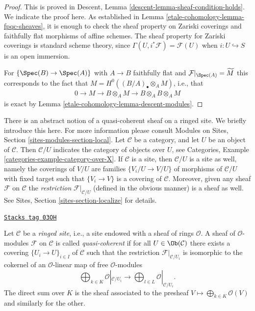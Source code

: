 \begin{proof}
This is proved in
Descent, Lemma \ref{descent-lemma-sheaf-condition-holds}.
We indicate the proof here. As established in
Lemma \ref{etale-cohomology-lemma-fpqc-sheaves},
it is enough to check the sheaf property
on Zariski coverings and faithfully flat morphisms of affine schemes. The
sheaf property for Zariski coverings is standard scheme theory, since
$\Gamma(U, i^\ast \mathcal{F}) = \mathcal{F}(U)$ when
$i : U \hookrightarrow S$ is an open immersion.

\medskip\noindent
For $\left\{\Spec(B)\to \Spec(A)\right\}$ with $A\to B$ faithfully
flat and
$\mathcal{F}|_{\Spec(A)} = \widetilde{M}$
this corresponds to the fact that
$M = H^0\left((B/A)_\bullet \otimes_A M \right)$, i.e., that
\begin{align*}
0 \to M \to B \otimes_A M \to B \otimes_A B \otimes_A M
\end{align*}
is exact by
Lemma \ref{etale-cohomology-lemma-descent-modules}.
\end{proof}

There is an abstract notion of a quasi-coherent sheaf on a ringed site.
We briefly introduce this here. For more information please consult
Modules on Sites, Section \ref{sites-modules-section-local}.
Let $\mathcal{C}$ be a category, and let $U$ be an object of $\mathcal{C}$.
Then $\mathcal{C}/U$ indicates the category of objects over $U$, see
Categories, Example \ref{categories-example-category-over-X}.
If $\mathcal{C}$ is a site, then $\mathcal{C}/U$ is a site as well, namely
the coverings of $V/U$ are families $\{V_i/U \to V/U\}$ of morphisms
of $\mathcal{C}/U$ with fixed target such that
$\{V_i \to V\}$ is a covering of $\mathcal{C}$. Moreover, given any
sheaf $\mathcal{F}$ on $\mathcal{C}$ the {\it restriction}
$\mathcal{F}|_{\mathcal{C}/U}$ (defined in the obvious manner)
is a sheaf as well. See
Sites, Section \ref{sites-section-localize}
for details.

\begin{definition}
\label{etale-cohomology-definition-ringed-site}
\href{https://stacks.math.columbia.edu/tag/03OH}{\texttt{Stacks tag 03OH}}

Let $\mathcal{C}$ be a {\it ringed site}, i.e., a site endowed with a
sheaf of rings $\mathcal{O}$. A sheaf of $\mathcal{O}$-modules $\mathcal{F}$ on
$\mathcal{C}$ is called {\it quasi-coherent} if for all
$U \in \Ob(\mathcal{C})$ there exists a covering
$\{U_i \to U\}_{i\in I}$ of $\mathcal{C}$ such that the restriction
$\mathcal{F}|_{\mathcal{C}/U_i}$ is isomorphic to the cokernel of
an $\mathcal{O}$-linear map of free $\mathcal{O}$-modules
$$
\bigoplus\nolimits_{k \in K} \mathcal{O}|_{\mathcal{C}/U_i}
\longrightarrow
\bigoplus\nolimits_{l \in L} \mathcal{O}|_{\mathcal{C}/U_i}.
$$
The direct sum over $K$ is the sheaf associated to the presheaf
$V \mapsto \bigoplus_{k \in K} \mathcal{O}(V)$ and similarly for the other.
\end{definition}

